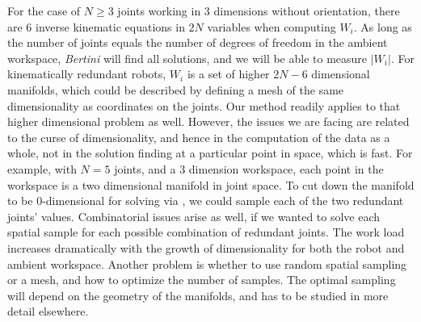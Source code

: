 \documentclass[12pt]{report}
\begin{document}

For the case of $N\geq3$ joints working in $3$ dimensions without orientation, there are 6 inverse kinematic equations in $2N$ variables when computing $W_i$.  As long as the number of joints equals the number of degrees of freedom in the ambient workspace, \emph{Bertini} will find all solutions, and we will be able to measure $|W_i|$.  For kinematically redundant robots, $W_i$ is a set of higher $2N-6$ dimensional manifolds, which could be described by defining a mesh of the same dimensionality as coordinates on the joints.  Our method readily applies to that higher dimensional problem as well.  However, the issues we are facing are related to the curse of dimensionality, and hence in the computation of the data as a whole, not in the solution finding at a particular point in space, which is fast.  For example, with $N=5$ joints, and a 3 dimension workspace, each point in the workspace is a two dimensional manifold in joint space.  To cut down the manifold to be 0-dimensional for solving via \bertini, we could sample each of the two redundant joints' values.  Combinatorial issues arise as well, if we wanted to solve each spatial sample for each possible combination of redundant joints.  The work load increases dramatically with the growth of dimensionality for both the robot and ambient workspace.  Another problem is whether to use random spatial sampling or a mesh, and how to optimize the number of samples.  The optimal sampling will depend on the geometry of the manifolds, and has to be studied in more detail elsewhere.  


%
\end{document}
